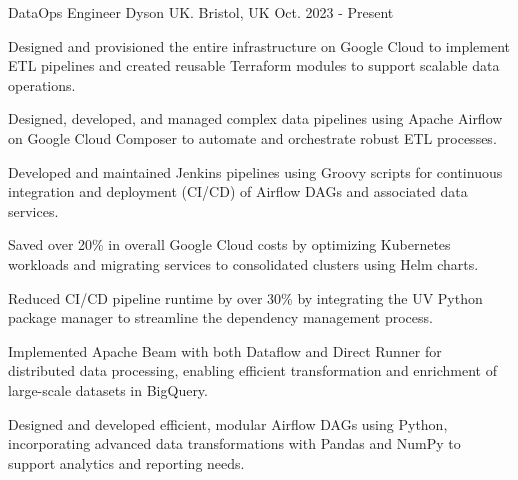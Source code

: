 

\begin{cventries}

  \cventry
    {DataOps Engineer} %
    {Dyson UK.} %
    {Bristol, UK} %
    {Oct. 2023 - Present} %
    {
      \begin{cvitems} %
        \item {Designed and provisioned the entire infrastructure on Google Cloud to implement ETL pipelines and created reusable Terraform modules to support scalable data operations.}
        \item {Designed, developed, and managed complex data pipelines using Apache Airflow on Google Cloud Composer to automate and orchestrate robust ETL processes.}
        \item {Developed and maintained Jenkins pipelines using Groovy scripts for continuous integration and deployment (CI/CD) of Airflow DAGs and associated data services.}
        \item {Saved over 20\% in overall Google Cloud costs by optimizing Kubernetes workloads and migrating services to consolidated clusters using Helm charts.}
        \item {Reduced CI/CD pipeline runtime by over 30\% by integrating the UV Python package manager to streamline the dependency management process.}
        \item {Implemented Apache Beam with both Dataflow and Direct Runner for distributed data processing, enabling efficient transformation and enrichment of large-scale datasets in BigQuery.}
        \item {Designed and developed efficient, modular Airflow DAGs using Python, incorporating advanced data transformations with Pandas and NumPy to support analytics and reporting needs.}
    \end{cvitems}
    }


\end{cventries}
